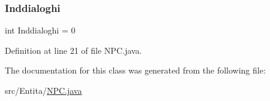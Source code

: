 \subsubsection{\texorpdfstring{Inddialoghi}{Inddialoghi}}
{\footnotesize\ttfamily int Inddialoghi = 0}



Definition at line 21 of file N\+P\+C.\+java.



The documentation for this class was generated from the following file\+:\begin{DoxyCompactItemize}
\item 
src/\+Entita/\hyperlink{_n_p_c_8java}{N\+P\+C.\+java}\end{DoxyCompactItemize}
